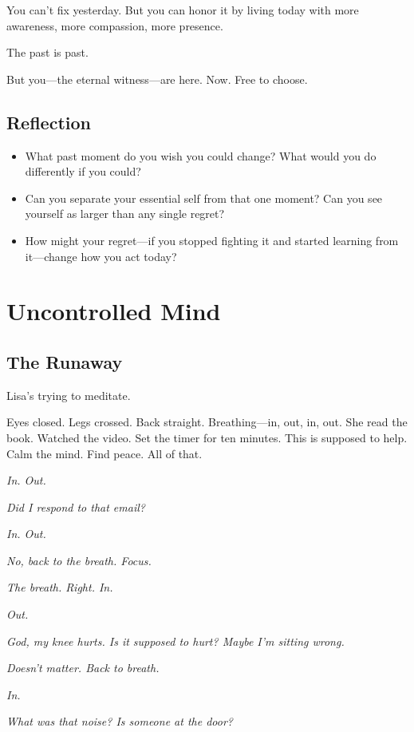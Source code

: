 \documentclass[11pt,twoside]{book}
\begin{document}
You can't fix yesterday. But you can honor it by living today with more awareness, more compassion, more presence.

The past is past.

But you—the eternal witness—are here. Now. Free to choose.

\section*{Reflection}

\begin{itemize}
\item What past moment do you wish you could change? What would you do differently if you could?
\item Can you separate your essential self from that one moment? Can you see yourself as larger than any single regret?
\item How might your regret—if you stopped fighting it and started learning from it—change how you act today?
\end{itemize}

\chapter{Uncontrolled Mind}

\section*{The Runaway}

Lisa's trying to meditate.

Eyes closed. Legs crossed. Back straight. Breathing—in, out, in, out. She read the book. Watched the video. Set the timer for ten minutes. This is supposed to help. Calm the mind. Find peace. All of that.

\emph{In. Out.}

\emph{Did I respond to that email?}

\emph{In. Out.}

\emph{No, back to the breath. Focus.}

\emph{The breath. Right. In.}

\emph{Out.}

\emph{God, my knee hurts. Is it supposed to hurt? Maybe I'm sitting wrong.}

\emph{Doesn't matter. Back to breath.}

\emph{In.}

\emph{What was that noise? Is someone at the door?}
\end{document}
